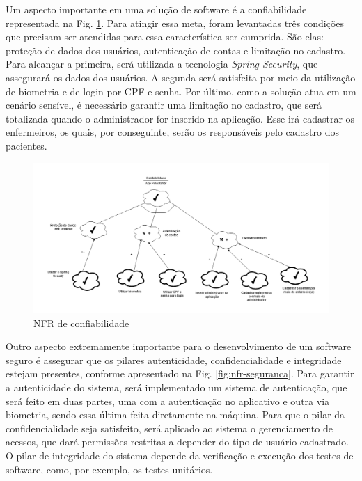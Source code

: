 Um aspecto importante em uma solução de software é a confiabilidade representada na Fig. \ref{fig:nfr-confiabilidade}. Para atingir essa meta, foram levantadas três condições que precisam ser atendidas para essa característica ser cumprida. São elas: proteção de dados dos usuários, autenticação de contas e limitação no cadastro. Para alcançar a primeira, será utilizada a tecnologia \textit{Spring Security}, que assegurará os dados dos usuários. A segunda será satisfeita por meio da utilização de biometria e de login por CPF e senha. Por último, como a solução atua em um cenário sensível, é necessário garantir uma limitação no cadastro, que será totalizada quando o administrador for inserido na aplicação. Esse irá cadastrar os enfermeiros, os quais, por conseguinte, serão os responsáveis pelo cadastro dos pacientes. 

\begin{figure}[H]
    \centering
    \includegraphics[width=\textwidth, keepaspectratio]{figuras/software/NFR/NFR_confiabilidade.png}
    \caption{NFR de confiabilidade}
    \label{fig:nfr-confiabilidade}
\end{figure}

Outro aspecto extremamente importante para o desenvolvimento de um software seguro é assegurar que os pilares autenticidade, confidencialidade e integridade estejam presentes, conforme apresentado na Fig. \ref{fig:nfr-seguranca}. Para garantir a autenticidade do sistema, será implementado um sistema de autenticação, que será feito em duas partes, uma com a autenticação no aplicativo e outra via biometria, sendo essa última feita diretamente na máquina. Para que o pilar da confidencialidade seja satisfeito, será aplicado ao sistema o gerenciamento de acessos, que dará permissões restritas a depender do tipo de usuário cadastrado. O pilar de integridade do sistema depende da verificação e execução dos testes de software, como, por exemplo, os testes unitários.

